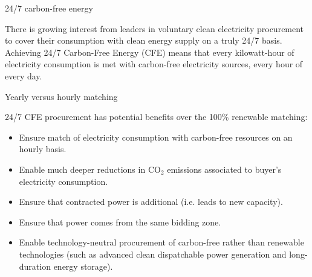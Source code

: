 \begin{frame}{24/7 carbon-free energy}

  \centering

  There is growing interest from leaders in voluntary clean
  electricity procurement to cover their consumption 
  with clean energy supply on a \alert{truly 24/7 basis}. \\
  \vspace{0.3cm}
  Achieving 24/7 Carbon-Free Energy (CFE) means that every kilowatt-hour of electricity consumption is met
  with carbon-free electricity sources, \alert{every hour of every day}.
  
\end{frame}



\begin{frame}{Yearly versus hourly matching}
  
  24/7 CFE procurement has potential benefits over the 100\% renewable matching:
  
  \begin{itemize}
  \item Ensure match of electricity consumption with carbon-free resources 
        on an \alert{hourly basis}.
  \item Enable much \alert{deeper reductions in CO$_2$ emissions} associated 
        to buyer's electricity consumption.
  \item Ensure that contracted power is \alert{additional} (i.e. leads to new capacity).
  \item Ensure that power comes from the \alert{same bidding zone}.
  \item Enable technology-neutral procurement of \alert{carbon-free} rather than renewable technologies 
        (such as advanced clean dispatchable power generation and long-duration energy storage).
  \end{itemize}
  
\end{frame}

